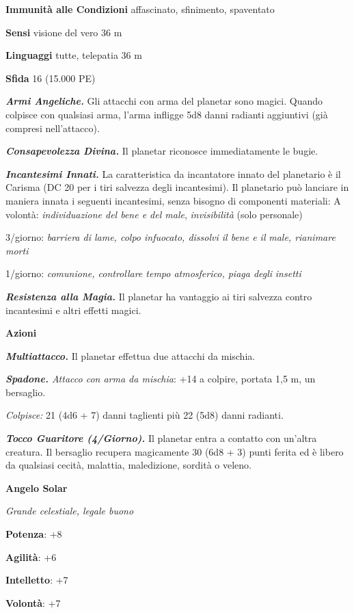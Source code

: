 \begin{multicols}{2}
\textbf{Immunità alle Condizioni} affascinato, sfinimento, spaventato

\textbf{Sensi} visione del vero 36 m

\textbf{Linguaggi} tutte, telepatia 36 m

\textbf{Sfida} 16 (15.000 PE)

\emph{\textbf{Armi Angeliche.}} Gli attacchi con arma del planetar sono
magici. Quando colpisce con qualsiasi arma, l'arma infligge 5d8 danni
radianti aggiuntivi (già compresi nell'attacco).

\emph{\textbf{Consapevolezza Divina.}} Il planetar riconosce
immediatamente le bugie.

\emph{\textbf{Incantesimi Innati.}} La caratteristica da incantatore
innato del planetario è il Carisma (DC 20 per i tiri salvezza degli
incantesimi). Il planetario può lanciare in maniera innata i seguenti
incantesimi, senza bisogno di componenti materiali: A volontà:
\emph{individuazione del bene e del male}, \emph{invisibilità} (solo
personale)

3/giorno: \emph{barriera di lame, colpo infuocato, dissolvi il bene e
il} \emph{male, rianimare morti}

1/giorno: \emph{comunione, controllare tempo atmosferico, piaga degli}
\emph{insetti}

\emph{\textbf{Resistenza alla Magia.}} Il planetar ha vantaggio ai tiri
salvezza contro incantesimi e altri effetti magici.

\textbf{Azioni}

\emph{\textbf{Multiattacco.}} Il planetar effettua due attacchi da
mischia.

\emph{\textbf{Spadone.} Attacco con arma da mischia}: +14 a colpire,
portata 1,5 m, un bersaglio.

\emph{Colpisce:} 21 (4d6 + 7) danni taglienti più 22 (5d8) danni
radianti.

\emph{\textbf{Tocco Guaritore (4/Giorno).}} Il planetar entra a contatto
con un'altra creatura. Il bersaglio recupera magicamente 30 (6d8 + 3)
punti ferita ed è libero da qualsiasi cecità, malattia, maledizione,
sordità o veleno.

\textbf{Angelo Solar}

\emph{Grande celestiale, legale buono}

\textbf{Potenza}: +8

\textbf{Agilità}: +6

\textbf{Intelletto}: +7

\textbf{Volontà}: +7


\end{multicols}
